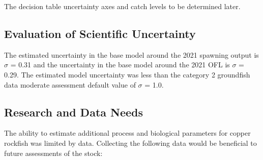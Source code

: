 \documentclass[11pt,
  english,
  a4paper,
]{article}
\begin{document}
\leavevmode\tagmcend\tagstructend\par


The decision table uncertainty axes and catch levels to be determined later.

\leavevmode\tagmcend\tagstructend\par


\hypertarget{evaluation-of-scientific-uncertainty}{%
\subsection{Evaluation of Scientific Uncertainty}\label{evaluation-of-scientific-uncertainty}}

\leavevmode\tagmcend\tagstructend


The estimated uncertainty in the base model around the 2021 spawning output is {\(\sigma\)\leavevmode\tagmcend\tagstructend} = 0.31 and the uncertainty in the base model around the 2021 OFL is {\(\sigma\)\leavevmode\tagmcend\tagstructend} = 0.29. The estimated model uncertainty was less than the category 2 groundfish data moderate assessment default value of {\(\sigma\)\leavevmode\tagmcend\tagstructend} = 1.0.

\leavevmode\tagmcend\tagstructend\par


\hypertarget{research-and-data-needs}{%
\subsection{Research and Data Needs}\label{research-and-data-needs}}

\leavevmode\tagmcend\tagstructend


The ability to estimate additional process and biological parameters for copper rockfish was limited by data. Collecting the following data would be beneficial to future assessments of the stock:

\leavevmode\tagmcend\tagstructend\par
\end{document}

